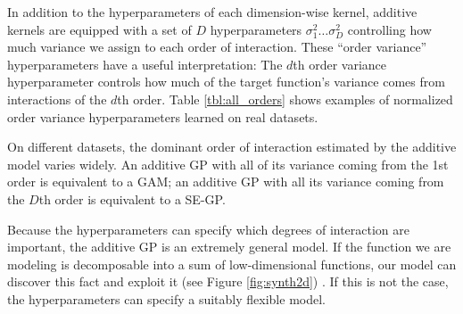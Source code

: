 In addition to the hyperparameters of each dimension-wise kernel, additive kernels are equipped with a set of $D$ hyperparameters $\sigma_1^2 \dots \sigma_D^2$ controlling how much variance we assign to each order of interaction.  These ``order variance'' hyperparameters have a useful interpretation:  The $d$th order variance hyperparameter controls how much of the target function's variance comes from interactions of the $d$th order.
%
%
%
%
Table \ref{tbl:all_orders} shows examples of normalized order variance hyperparameters learned on real datasets.


On different datasets, the dominant order of interaction estimated by the additive model varies widely.  An additive GP with all of its variance coming from the 1st order is equivalent to a GAM; an additive GP with all its variance coming from the $D$th order is equivalent to a SE-GP.
%
%


Because the hyperparameters can specify which degrees of interaction are important, the additive GP is an extremely general model.  
  If the function we are modeling is decomposable into a sum of low-dimensional functions, our model can discover this fact and exploit it (see Figure \ref{fig:synth2d}) .  If this is not the case, the hyperparameters can specify a suitably flexible model.


